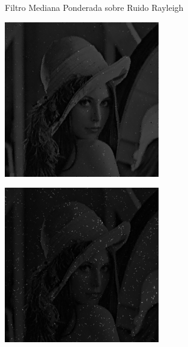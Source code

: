 \documentclass{beamer}
\begin{document}
\begin{frame}[fragile]{Filtro Mediana Ponderada sobre Ruido Rayleigh}
	\begin{minipage}{0.25\linewidth}
		\centering
		\includegraphics[width=\linewidth]{../results/lena_rayleigh_xi1_mediana_ponderada}
	\end{minipage}\hfill
	\begin{minipage}{0.25\linewidth}
		\centering
		\includegraphics[width=\linewidth]{../results/lena_rayleigh_xi2_mediana_ponderada}

\end{minipage}
\end{frame}
\end{document}
